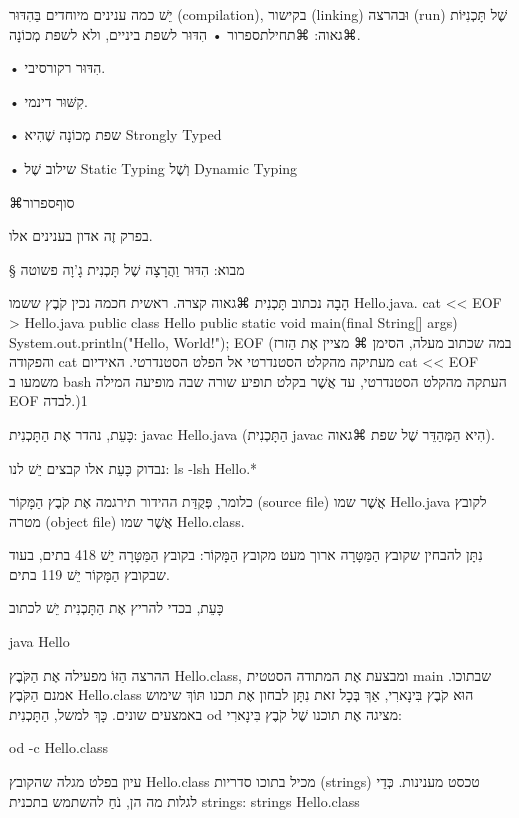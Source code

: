 
יֵשׁ כמה ענינים מיוחדים בַּהִדּוּר (compilation), בקישור (linking) וּבהרצה (run)
שֶׁל תָּכְנִיּוֹת ⌘גאוה:
⌘תחילת{ספרור}
•  הִדּוּר לשפת ביניים, ולא לשפת מְכוֹנָה.

•  הִדּוּר רקורסיבי.

•  קִשּׁוּר דינמי.

•  שפת מְכוֹנָה שֶׁהִיא Strongly Typed

•  שילוב שֶׁל Static Typing וְשֶׁל Dynamic Typing

⌘סוף{ספרור}

בפרק זֶה אדון בענינים אלו.


§ מבוא: הִדּוּר וַהֲרָצָה שֶׁל תָּכְנִית גָ'וָה פשוטה


הָבָה נכתוב תָּכְנִית ⌘גאוה קצרה. ראשית חכמה נכין קֹבֶץ ששמו Hello.java.
cat << EOF > Hello.java
public class Hello {
  public static void main(final String[] args) {
    System.out.println("Hello, World!\n");
  }
}
EOF
\END
(במה שכתוב מעלה, הסימן ⌘
מציין אֶת הַזרז והפקודה cat מעתיקה מהקלט הסטנדרטי
אל הפלט הסטנדרטי. האידיום cat << EOF משמעו ב bash העתקה מהקלט הסטנדרטי, עד
אֲשֶׁר בקלט תופיע שורה שבה מופיעה המילה EOF לבדה.)1

כָּעֵת, נהדר אֶת הַתָּכְנִית:
javac Hello.java
\END
(הַתָּכְנִית javac הִיא הַמְּהַדֵּר שֶׁל שפת ⌘גאוה).

נבדוק כָּעֵת אלו קבצים יֵשׁ לנו:
ls -lsh Hello.*
\END

כלומר, פְּקֻדַּת ההידור תירגמה אֶת קֹבֶץ הַמָּקוֹר (source file) אֲשֶׁר שמו Hello.java  
לקובץ מטרה (object file) אֲשֶׁר שמו Hello.class.

נִתָּן להבחין שקובץ הַמַּטָּרָה ארוך מעט מקובץ הַמָּקוֹר: בקובץ הַמַּטָּרָה יֵשׁ
418 בתים, בעוד שבקובץ הַמָּקוֹר יֵשׁ  119 בתים.

כָּעֵת, בכדי להריץ אֶת הַתָּכְנִית יֵשׁ לכתוב

java Hello
\END

ההרצה הַזּוֹ מפעילה אֶת הַקֹּבֶץ Hello.class, ומבצעת אֶת המתודה הסטטית main
שבתוכו.
אמנם הַקֹּבֶץ Hello.class הוּא קֹבֶץ בִּינָארִי, אַךְ בְּכָל זאת נִתָּן לבחון
אֶת תכנו תּוֹךְ שימוש באמצעים שונים. כָּךְ למשל, הַתָּכְנִית od מציגה אֶת תוכנו
שֶׁל קֹבֶץ בִּינָארִי:

od -c Hello.class
\END


עיון בפלט מגלה שהקובץ Hello.class מכיל בתוכו סדריות (strings) טכסט מענינות.
כְּדֵי לגלות מה הן, נֹחַ להשתמש בתכנית strings:
strings Hello.class
\END

